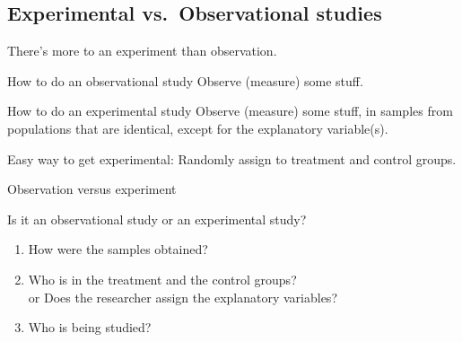 \subsection{Experimental vs.\ Observational studies}

\begin{frame}{There's more to an experiment than observation.}

  \begin{block}{How to do an observational study}
    \alert{Observe} (measure) some stuff.
  \end{block}

  \vspace{2em}

  \begin{block}{How to do an experimental study}
    Observe (measure) some stuff, 
    in samples from populations that are identical,
    except for the explanatory variable(s).
  \end{block}

  \vspace{2em}

  \alert{Easy way to get experimental:}
  Randomly assign to treatment and control groups.

\end{frame}

%
\begin{frame}{Observation versus experiment}

  Is it an observational study or an experimental study?
  \begin{enumerate}

    \item How were the samples obtained?

    \item Who is in the treatment and the control groups? \\
      \alert{or} Does the researcher assign the explanatory variables?

    \item Who is being studied?

  \end{enumerate}

\end{frame}

%


